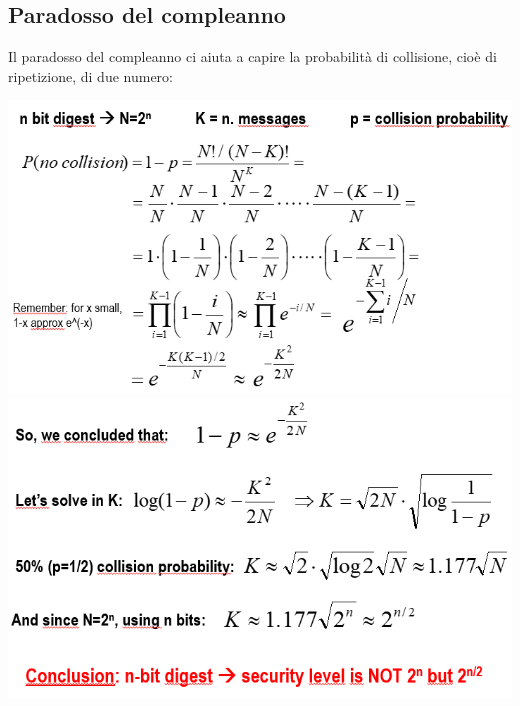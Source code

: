 \documentclass{book}
\theoremstyle{remark}
\begin{document}
\subsection{Paradosso del compleanno}
Il paradosso del compleanno ci aiuta a capire la probabilità di collisione, cioè di ripetizione, di due numero:
\begin{center}
	\includegraphics[scale=0.5]{birthdaypdx}
	\includegraphics[scale=0.5]{birthdaypdx2}
\end{center}
\end{document}
